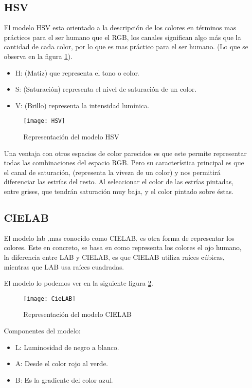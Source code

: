 \subsection{HSV}
El modelo HSV \cite{modelo:hsv} esta orientado a la descripción de los colores en términos mas prácticos para el ser humano que el RGB, los canales significan algo más que la cantidad de cada color, por lo que es mas práctico para el ser humano. (Lo que se observa en la figura \ref{fig:3.4}).
 
\begin{itemize}
	\item H: (Matiz) que representa el tono o color.
	\item S: (Saturación) representa el nivel de saturación de un color.
	\item V: (Brillo) representa la intensidad lumínica.
\end{itemize}

\begin{figure}[h]
\centering
\texttt{[image: HSV]}
\caption{Representación del modelo HSV~\cite{Manual:HAE}}
\label{fig:3.4}
\end{figure}

Una ventaja con otros espacios de color parecidos es que este permite representar todas las combinaciones del espacio RGB.
Pero su característica principal es que el canal de saturación, (representa la viveza de un color) y nos permitirá diferenciar las estrías del resto. Al seleccionar el color de las estrías pintadas, entre grises, que tendrán saturación muy baja, y el color pintado sobre éstas.

\subsection{CIELAB}
El modelo lab \cite{wiki:lab},mas conocido como CIELAB, es otra forma de representar los colores. Este en concreto, se basa en como representa los colores el ojo humano, la diferencia entre LAB y CIELAB, es que CIELAB utiliza raíces cúbicas, mientras que LAB usa raíces cuadradas.

El modelo lo podemos ver en la siguiente figura  \ref{fig:3.8}.

\begin{figure}[h]
\centering
\texttt{[image: CieLAB]}
\caption{Representación del modelo CIELAB~\cite{cie:LAB}}
\label{fig:3.8}
\end{figure}


Componentes del modelo:
\begin{itemize}
	\item L: Luminosidad de negro a blanco.
	\item A: Desde el color rojo al verde.
	\item B: Es la gradiente del color azul.
\end{itemize}

